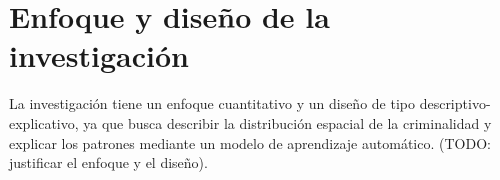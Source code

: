
\section{Enfoque y diseño de la investigación}

\label{sec:enfoque}

La investigación tiene un enfoque cuantitativo y un diseño de tipo
descriptivo-explicativo, ya que busca describir la distribución espacial
de la criminalidad y explicar los patrones mediante un modelo de aprendizaje
automático. (TODO: justificar el enfoque y el diseño).
